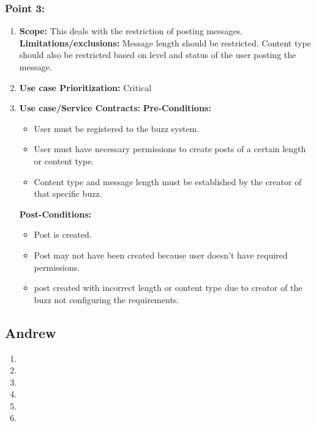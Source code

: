 \documentclass[11pt]{article}
\begin{document}
\subsubsection{Point 3:} 
\begin{enumerate}
\item 
\textbf{Scope:}
This deals with the restriction of posting messages.
\newline
\textbf{Limitations/exclusions:} 
Message length should be restricted. Content type should also be restricted based on level and status of the user posting the message.

\item 
\textbf{Use case Prioritization:} Critical

\item 
\textbf{Use case/Service Contracts:} 
\newline
\textbf{Pre-Conditions: }
\begin{itemize}
\item User must be registered to the buzz system.
\item User must have necessary permissions to create posts of a certain length or content type.
\item Content type and message length must be established by the creator of that specific buzz.
\end{itemize}
 

\textbf{Post-Conditions: }
\begin{itemize}
\item Post is created.
\item Post may not have been created because user doesn't have required permissions.
\item post created with incorrect length or content type due to creator of the buzz not configuring the requirements.
\end{itemize}
\end{enumerate}

\newpage

\subsection{Andrew}
\begin{enumerate}
\item 
\item 
\item 
\item 
\item 
\item 
\end{enumerate}
\end{document}
